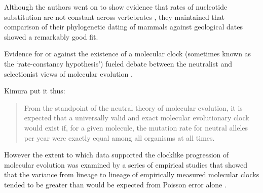 Although the authors went on to show evidence that rates of nucleotide substitution are not constant across vertebrates \cite{LangleyFitch1974}, they maintained that comparison of their phylogenetic dating of mammals against geological dates showed a remarkably good fit. 

Evidence for or against the existence of a molecular clock (sometimes known as the `rate-constancy hypothesis') fueled debate between the neutralist and selectionist views of molecular evolution \cite{Kimura1987}.

Kimura \cite{Kimura1987} put it thus:

\begin{quotation}
From the standpoint of the neutral theory of molecular evolution, it is expected that a universally valid and exact molecular evolutionary clock would exist if, for a given molecule, the mutation rate for neutral alleles per year were exactly equal among all organisms at all times.
\end{quotation}
 
However the extent to which data supported the clocklike progression of molecular evolution was examined by a series of empirical studies that showed that the variance from lineage to lineage of empirically measured molecular clocks tended to be greater than would be expected from Poisson error alone \cite{LangleyFitch1974,Kimura1987}.

  
  
  
  
  
  
  
  
  
  
  
  
  
  
  
  
  
  
  
  
  
  
  
  
  